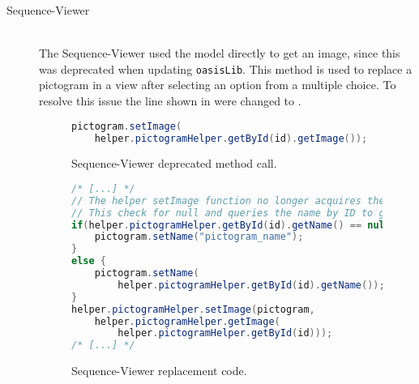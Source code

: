 \begin{description}
    \item[Sequence-Viewer] \hfill \\
    The Sequence-Viewer used the model directly to get an image, since this was deprecated when updating \texttt{oasisLib}.
    This method is used to replace a pictogram in a view after selecting an option from a multiple choice. 
    To resolve this issue the line shown in  were changed to . 

\begin{figure}
    \begin{lstlisting}[language=java]
pictogram.setImage(
    helper.pictogramHelper.getById(id).getImage());
    \end{lstlisting}
    \caption{Sequence-Viewer deprecated method call. }\label{lst:dep-sv-prev}
\end{figure}
\begin{figure}
    \begin{lstlisting}[language=java]
/* [...] */
// The helper setImage function no longer acquires the pictogram name and causes null exception error
// This check for null and queries the name by ID to get name
if(helper.pictogramHelper.getById(id).getName() == null) {
    pictogram.setName("pictogram_name");
}
else {
    pictogram.setName(
        helper.pictogramHelper.getById(id).getName());
}
helper.pictogramHelper.setImage(pictogram, 
    helper.pictogramHelper.getImage(
        helper.pictogramHelper.getById(id)));
/* [...] */
    \end{lstlisting}
    \caption{Sequence-Viewer replacement code. }\label{lst:dep-sv-upd}
\end{figure}


\end{description}
